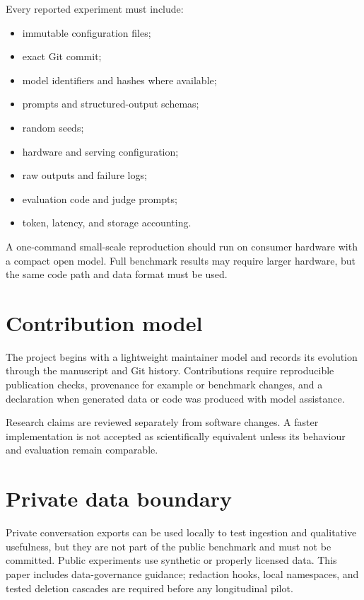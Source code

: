 \documentclass[
  english,
  a4paper,
  DIV=11,
  numbers=noendperiod]{scrreprt}
\providecommand{\tightlist}{%
  \setlength{\itemsep}{0pt}\setlength{\parskip}{0pt}}
\begin{document}
Every reported experiment must include:

\begin{itemize}
\tightlist
\item
  immutable configuration files;
\item
  exact Git commit;
\item
  model identifiers and hashes where available;
\item
  prompts and structured-output schemas;
\item
  random seeds;
\item
  hardware and serving configuration;
\item
  raw outputs and failure logs;
\item
  evaluation code and judge prompts;
\item
  token, latency, and storage accounting.
\end{itemize}

A one-command small-scale reproduction should run on consumer hardware
with a compact open model. Full benchmark results may require larger
hardware, but the same code path and data format must be used.

\section{Contribution model}\label{contribution-model}

The project begins with a lightweight maintainer model and records its
evolution through the manuscript and Git history. Contributions require
reproducible publication checks, provenance for example or benchmark
changes, and a declaration when generated data or code was produced with
model assistance.

Research claims are reviewed separately from software changes. A faster
implementation is not accepted as scientifically equivalent unless its
behaviour and evaluation remain comparable.

\section{Private data boundary}\label{private-data-boundary}

Private conversation exports can be used locally to test ingestion and
qualitative usefulness, but they are not part of the public benchmark
and must not be committed. Public experiments use synthetic or properly
licensed data. This paper includes data-governance guidance; redaction
hooks, local namespaces, and tested deletion cascades are required
before any longitudinal pilot.
\end{document}

